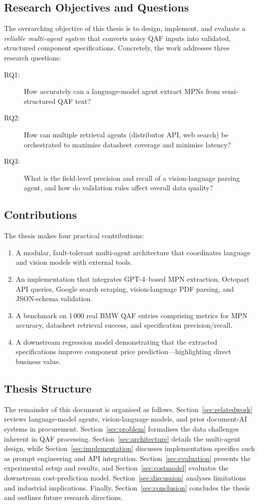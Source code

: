 \documentclass[11pt]{article}
\begin{document}
\subsection{Research Objectives and Questions}
The overarching objective of this thesis is to design, implement, and evaluate a \emph{reliable multi-agent system} that converts noisy QAF inputs into validated, structured component specifications.  
Concretely, the work addresses three research questions:

\begin{description}
  \item[RQ1:] How accurately can a language-model agent extract MPNs from semi-structured QAF text?
  \item[RQ2:] How can multiple retrieval agents (distributor API, web search) be orchestrated to maximise datasheet coverage and minimise latency?
  \item[RQ3:] What is the field-level precision and recall of a vision-language parsing agent, and how do validation rules affect overall data quality?
\end{description}

\subsection{Contributions}
The thesis makes four practical contributions:
\begin{enumerate}
  \item A modular, fault-tolerant multi-agent architecture that coordinates language and vision models with external tools.
  \item An implementation that integrates GPT-4–based MPN extraction, Octopart API queries, Google search scraping, vision-language PDF parsing, and JSON-schema validation.
  \item A benchmark on 1\,000 real BMW QAF entries comprising metrics for MPN accuracy, datasheet retrieval success, and specification precision/recall.
  \item A downstream regression model demonstrating that the extracted specifications improve component price prediction—highlighting direct business value.
\end{enumerate}

\subsection{Thesis Structure}
The remainder of this document is organised as follows.  
Section~\ref{sec:relatedwork} reviews language-model agents, vision-language models, and prior document-AI systems in procurement.  
Section~\ref{sec:problem} formalises the data challenges inherent in QAF processing.  
Section~\ref{sec:architecture} details the multi-agent design, while Section~\ref{sec:implementation} discusses implementation specifics such as prompt engineering and API integration.  
Section~\ref{sec:evaluation} presents the experimental setup and results, and Section~\ref{sec:costmodel} evaluates the downstream cost-prediction model.  
Section~\ref{sec:discussion} analyses limitations and industrial implications.  
Finally, Section~\ref{sec:conclusion} concludes the thesis and outlines future research directions.
\end{document}
